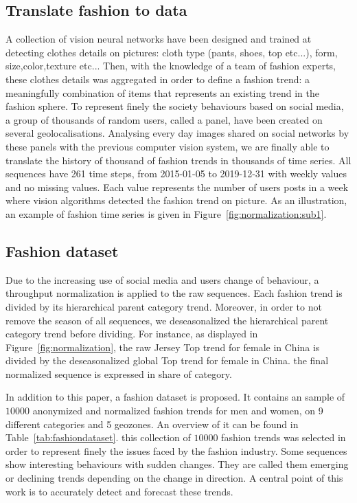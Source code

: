 \documentclass{article} %
\newcommand{\numberts}{10000}
\begin{document}
\subsection{Translate fashion to data}
\label{sec:dataset:a}
A collection of vision neural networks have been designed and trained  at detecting clothes details on pictures: cloth type (pants, shoes, top etc...), form, size,color,texture etc... Then, with the knowledge of a team of fashion experts, these clothes details was aggregated in order to define a fashion trend: a meaningfully combination of items that represents an existing trend in the fashion sphere. To represent finely the society behaviours based on social media, a group of thousands of random users, called a panel, have been created on several geolocalisations. Analysing every day images shared on social networks by these panels with the previous computer vision system, we are finally able to translate the history of thousand of fashion trends in thousands of time series.  All sequences have 261 time steps, from 2015-01-05 to 2019-12-31 with weekly values and no missing values. Each value represents the number of users posts in a week where vision algorithms detected the fashion trend on picture.  As an illustration, an example of fashion time series is given in Figure~\ref{fig:normalization:sub1}.

\subsection{Fashion dataset}
\label{sec:dataset:b}

Due to the increasing use of social media and users change of behaviour, a throughput normalization is applied to the raw sequences. Each fashion trend is divided by its hierarchical parent category trend. Moreover, in order to not remove the season of all sequences, we deseasonalized the hierarchical parent category trend before dividing. For instance, as displayed in Figure~\ref{fig:normalization}, the raw Jersey Top trend for female in China is divided by the deseasonalized global Top trend for female in China. the final normalized sequence is expressed in share of category.

In addition to this paper, a fashion dataset is proposed. It contains an sample of $\numberts$ anonymized and  normalized fashion trends for men and women, on 9 different categories and 5 geozones. An overview of it can be found in Table~\ref{tab:fashiondataset}. this collection of $\numberts$ fashion trends was selected in order to represent finely the issues faced by the fashion industry. Some sequences show interesting behaviours with sudden changes. They are called them emerging or declining trends depending on the change in direction. A central point of this work is to accurately detect and forecast these trends.
\end{document}
